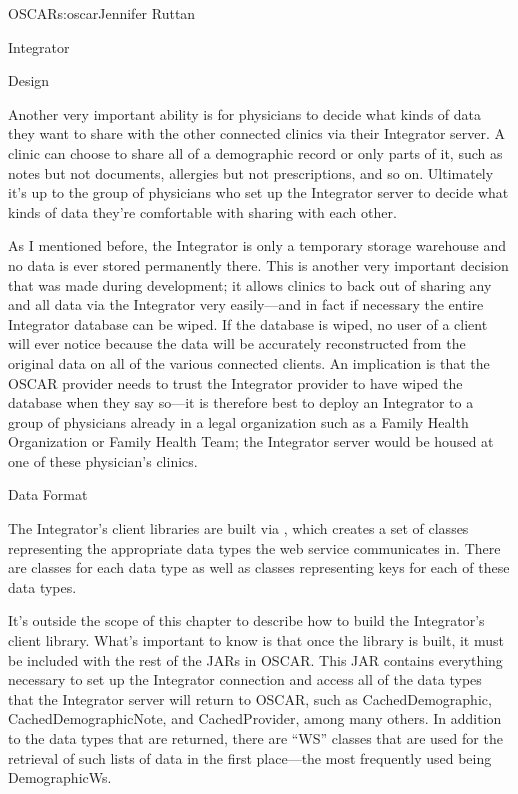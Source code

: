 \begin{aosachapter}{OSCAR}{s:oscar}{Jennifer Ruttan}
\begin{aosasect1}{Integrator}
\begin{aosasect2}{Design}

Another very important ability is for physicians to decide what kinds
of data they want to share with the other connected clinics via their
Integrator server. A clinic can choose to share all of a demographic
record or only parts of it, such as notes but not documents, allergies
but not prescriptions, and so on. Ultimately it's up to the group of
physicians who set up the Integrator server to decide what kinds of
data they're comfortable with sharing with each other.

As I mentioned before, the Integrator is only a temporary
storage warehouse and no data is ever stored permanently there. This
is another very important decision that was made during development;
it allows clinics to back out of sharing any and all data via the
Integrator very easily---and in fact if necessary the entire
Integrator database can be wiped. If the database is wiped, no user of
a client will ever notice because the data will be accurately
reconstructed from the original data on all of the various connected
clients. An implication is that the OSCAR provider needs to trust the
Integrator provider to have wiped the database when they say so---it
is therefore best to deploy an Integrator to a group of physicians
already in a legal organization such as a Family Health Organization
or Family Health Team; the Integrator server would be housed at one of
these physician's clinics.

\end{aosasect2}

\begin{aosasect2}{Data Format}

The Integrator's client libraries are built via , which
creates a set of classes representing the appropriate data types the
web service communicates in. There are classes for each data type as
well as classes representing keys for each of these data types.

It's outside the scope of this chapter to describe how to build the
Integrator's client library. What's important to know is that once the
library is built, it must be included with the rest of the JARs in
OSCAR. This JAR contains everything necessary to set up the Integrator
connection and access all of the data types that the Integrator server
will return to OSCAR, such as CachedDemographic,
CachedDemographicNote, and CachedProvider, among many others. In
addition to the data types that are returned, there are ``WS'' classes
that are used for the retrieval of such lists of data in the first
place---the most frequently used being DemographicWs.


\end{aosasect2}
\end{aosasect1}
\end{aosachapter}

